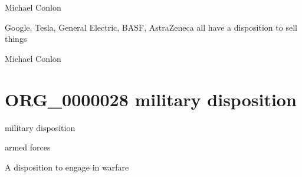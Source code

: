 \documentclass[letterpaper,10pt,english]{sphinxmanual}
\begin{document}
\begin{sphinxShadowBox}

\sphinxAtStartPar
Michael Conlon 
\end{sphinxShadowBox}

\begin{sphinxShadowBox}

\sphinxAtStartPar
Google, Tesla, General Electric, BASF, AstraZeneca all have a disposition to sell things
\end{sphinxShadowBox}

\begin{sphinxShadowBox}

\sphinxAtStartPar
Michael Conlon 
\end{sphinxShadowBox}
\begin{quote}
\label{\detokenize{doc-ORG_0000028:org-0000028}}\label{\detokenize{doc-ORG_0000028:military-disposition}}\label{\detokenize{doc-ORG_0000028:org-0000028}}
\ignorespaces \end{quote}


\section{ORG\_0000028 \sphinxhyphen{} military disposition}
\label{\detokenize{doc-ORG_0000028:org-0000028-military-disposition}}\label{\detokenize{doc-ORG_0000028:index-0}}\label{\detokenize{doc-ORG_0000028::doc}}
\begin{sphinxShadowBox}

\sphinxAtStartPar
military disposition
\end{sphinxShadowBox}

\begin{sphinxShadowBox}

\sphinxAtStartPar
armed forces
\end{sphinxShadowBox}

\begin{sphinxShadowBox}

\sphinxAtStartPar
A disposition to engage in warfare
\end{sphinxShadowBox}
\end{document}
